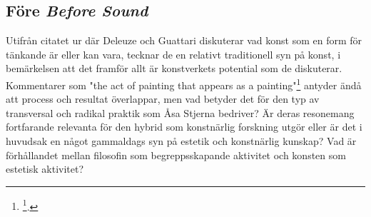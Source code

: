\documentclass[11pt]{article}
\begin{document}
\subsection{Före \emph{Before Sound}}
\label{sec:orgc6e08ea}
Utifrån citatet ur där Deleuze och Guattari diskuterar vad konst som en
form för tänkande är eller kan vara, tecknar de en relativt traditionell
syn på konst, i bemärkelsen att det framför allt är konstverkets
potential som de diskuterar. Kommentarer som "the act of painting that
appears as a painting"\footnote{\footcite[s.197]{deleuze1994}.} antyder ändå att process och resultat
överlappar, men vad betyder det för den typ av transversal och radikal
praktik som Åsa Stjerna bedriver? Är deras resonemang fortfarande
relevanta för den hybrid som konstnärlig forskning utgör eller är det i
huvudsak en något gammaldags syn på estetik och konstnärlig kunskap? Vad
är förhållandet mellan filosofin som begreppsskapande aktivitet och
konsten som estetisk aktivitet?
\end{document}
